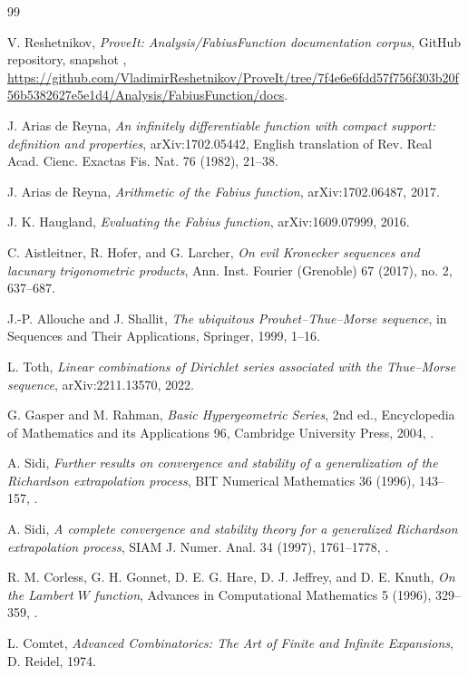 \documentclass[11pt]{article}
\numberwithin{equation}{section}
\theoremstyle{definition}
\theoremstyle{remark}
\begin{document}
\begin{thebibliography}{99}

V. Reshetnikov,
\emph{ProveIt: Analysis/FabiusFunction documentation corpus},
GitHub repository, snapshot \commitsha,
\url{https://github.com/VladimirReshetnikov/ProveIt/tree/7f4e6e6fdd57f756f303b20f56b5382627e5e1d4/Analysis/FabiusFunction/docs}.

J. Arias de Reyna,
\emph{An infinitely differentiable function with compact support: definition and properties},
arXiv:1702.05442, English translation of Rev. Real Acad. Cienc. Exactas Fis. Nat. 76 (1982), 21--38.

J. Arias de Reyna,
\emph{Arithmetic of the Fabius function},
arXiv:1702.06487, 2017.

J. K. Haugland,
\emph{Evaluating the Fabius function},
arXiv:1609.07999, 2016.

C. Aistleitner, R. Hofer, and G. Larcher,
\emph{On evil Kronecker sequences and lacunary trigonometric products},
Ann. Inst. Fourier (Grenoble) 67 (2017), no. 2, 637--687.

J.-P. Allouche and J. Shallit,
\emph{The ubiquitous Prouhet--Thue--Morse sequence},
in Sequences and Their Applications, Springer, 1999, 1--16.

L. Toth,
\emph{Linear combinations of Dirichlet series associated with the Thue--Morse sequence},
arXiv:2211.13570, 2022.

G. Gasper and M. Rahman,
\emph{Basic Hypergeometric Series}, 2nd ed.,
Encyclopedia of Mathematics and its Applications 96, Cambridge University Press, 2004,
.

A. Sidi,
\emph{Further results on convergence and stability of a generalization of the Richardson extrapolation process},
BIT Numerical Mathematics 36 (1996), 143--157,
.

A. Sidi,
\emph{A complete convergence and stability theory for a generalized Richardson extrapolation process},
SIAM J. Numer. Anal. 34 (1997), 1761--1778,
.

R. M. Corless, G. H. Gonnet, D. E. G. Hare, D. J. Jeffrey, and D. E. Knuth,
\emph{On the Lambert $W$ function},
Advances in Computational Mathematics 5 (1996), 329--359,
.

L. Comtet,
\emph{Advanced Combinatorics: The Art of Finite and Infinite Expansions},
D. Reidel, 1974.

\end{thebibliography}
\end{document}
